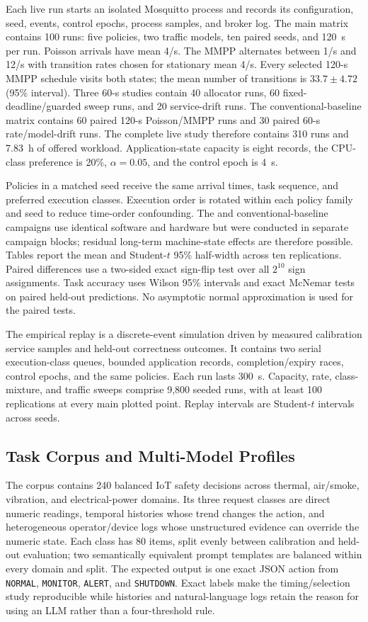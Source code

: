 Each live run starts an isolated Mosquitto process and records its configuration, seed, events, control epochs, process samples, and broker log. The main matrix contains 100 runs: five policies, two traffic models, ten paired seeds, and 120~s per run. Poisson arrivals have mean 4/s. The MMPP alternates between 1/s and 12/s with transition rates chosen for stationary mean 4/s. Every selected 120-s MMPP schedule visits both states; the mean number of transitions is $33.7\pm4.72$ (95\% interval). Three 60-s studies contain 40 allocator runs, 60 fixed-deadline/guarded sweep runs, and 20 service-drift runs. The conventional-baseline matrix contains 60 paired 120-s Poisson/MMPP runs and 30 paired 60-s rate/model-drift runs. The complete live study therefore contains 310 runs and 7.83~h of offered workload. Application-state capacity is eight records, the CPU-class preference is 20\%, $\alpha=0.05$, and the control epoch is 4~s.

Policies in a matched seed receive the same arrival times, task sequence, and preferred execution classes. Execution order is rotated within each policy family and seed to reduce time-order confounding. The \method{} and conventional-baseline campaigns use identical software and hardware but were conducted in separate campaign blocks; residual long-term machine-state effects are therefore possible. Tables report the mean and Student-$t$ 95\% half-width across ten replications. Paired differences use a two-sided exact sign-flip test over all $2^{10}$ sign assignments. Task accuracy uses Wilson 95\% intervals and exact McNemar tests on paired held-out predictions. No asymptotic normal approximation is used for the paired tests.

The empirical replay is a discrete-event simulation driven by measured calibration service samples and held-out correctness outcomes. It contains two serial execution-class queues, bounded application records, completion/expiry races, control epochs, and the same policies. Each run lasts 300~s. Capacity, rate, class-mixture, and traffic sweeps comprise 9,800 seeded runs, with at least 100 replications at every main plotted point. Replay intervals are Student-$t$ intervals across seeds.

\subsection{Task Corpus and Multi-Model Profiles}

The corpus contains 240 balanced IoT safety decisions across thermal, air/smoke, vibration, and electrical-power domains. Its three request classes are direct numeric readings, temporal histories whose trend changes the action, and heterogeneous operator/device logs whose unstructured evidence can override the numeric state. Each class has 80 items, split evenly between calibration and held-out evaluation; two semantically equivalent prompt templates are balanced within every domain and split. The expected output is one exact JSON action from \texttt{NORMAL}, \texttt{MONITOR}, \texttt{ALERT}, and \texttt{SHUTDOWN}. Exact labels make the timing/selection study reproducible while histories and natural-language logs retain the reason for using an LLM rather than a four-threshold rule.

